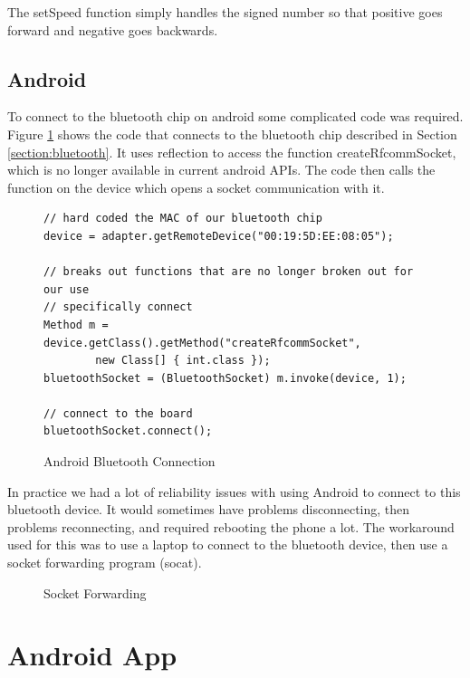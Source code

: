 The setSpeed function simply handles the signed number so that positive goes forward and negative goes backwards.

\subsection{Android}
\label{section:android_wireless}

To connect to the bluetooth chip on android some complicated code was required.  Figure \ref{figure:android_bluetooth} shows the code that connects to the bluetooth chip described in Section \ref{section:bluetooth}.  It uses reflection to access the function createRfcommSocket, which is no longer available in current android APIs.  The code then calls the function on the device which opens a socket communication with it.

\begin{figure}[H]
\begin{lstlisting}
// hard coded the MAC of our bluetooth chip
device = adapter.getRemoteDevice("00:19:5D:EE:08:05");

// breaks out functions that are no longer broken out for our use
// specifically connect
Method m = device.getClass().getMethod("createRfcommSocket",
		new Class[] { int.class });
bluetoothSocket = (BluetoothSocket) m.invoke(device, 1);

// connect to the board
bluetoothSocket.connect();
\end{lstlisting}
\caption{Android Bluetooth Connection}
\label{figure:android_bluetooth}
\end{figure}

In practice we had a lot of reliability issues with using Android to connect to this bluetooth device.  It would sometimes have problems disconnecting, then problems reconnecting, and required rebooting the phone a lot.  The workaround used for this was to use a laptop to connect to the bluetooth device, then use a socket forwarding program (socat).

\begin{figure}[H]
\caption{Socket Forwarding}
\label{figure:socket_forwarding}
\end{figure}

\section{Android App}

